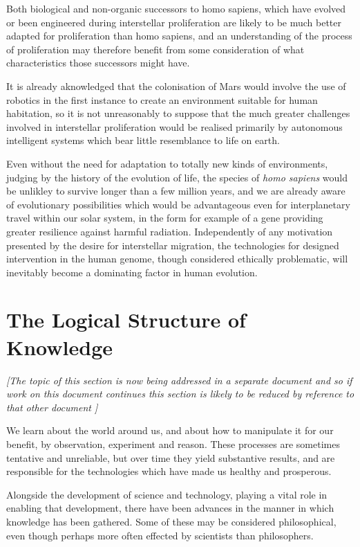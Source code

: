 \documentclass[10pt,titlepage]{article}
\begin{document}
{Both biological and non-organic successors to homo sapiens, which have evolved or been engineered during interstellar proliferation are likely to be much better adapted for proliferation than homo sapiens, and an understanding of the process of proliferation may therefore benefit from some consideration of what characteristics those successors might have.

It is already aknowledged that the colonisation of Mars would involve the use of robotics in the first instance to create an environment suitable for human habitation, so it is not unreasonably to suppose that the much greater challenges involved in interstellar proliferation would be realised primarily by autonomous intelligent systems which bear little resemblance to life on earth.

Even without the need for adaptation to totally new kinds of environments, judging by the history of the evolution of life, the species of \emph{homo sapiens} would be unlikley to survive longer than a few million years, and we are already aware of evolutionary possibilities which would be advantageous even for interplanetary travel within our solar system, in the form for example of a gene providing greater resilience against harmful radiation.
Independently of any motivation presented by the desire for interstellar migration, the technologies for designed intervention in the human genome, though considered ethically problematic, will inevitably become a dominating factor in human evolution.

}%

\section{The Logical Structure of Knowledge}

\emph{[The topic of this section is now being addressed in a separate document and so if work on this document continues this section is likely to be reduced by reference to that other document \cite{rbjp047}]}

We learn about the world around us, and about how to manipulate it for our benefit, by observation, experiment and reason.
These processes are sometimes tentative and unreliable, but over time they yield substantive results, and are responsible for the technologies which have made us healthy and prosperous.

Alongside the development of science and technology, playing a vital role in enabling that development, there have been advances in the manner in which knowledge has been gathered.
Some of these may be considered philosophical, even though perhaps more often effected by scientists than philosophers.
\end{document}
